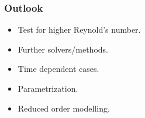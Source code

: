 \documentclass{beamer}
\begin{document}

\begin{frame}
\frametitle{Outlook}
\begin{itemize}

\item Test for higher Reynold's number.
\item Further solvers/methods.
\item Time dependent cases.
\item Parametrization.
\item Reduced order modelling.

\end{itemize}


\end{frame}





\end{document}
